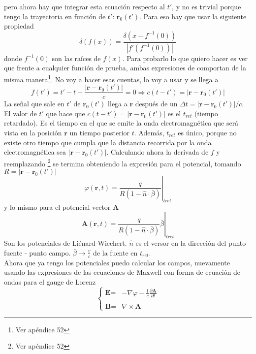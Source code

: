 pero ahora hay que integrar esta ecuación respecto al $t'$, y no es trivial porque tengo la trayectoria en función de $t'$: $\textbf{r}_{0}(t')$. Para eso hay que usar la siguiente propiedad
\begin{equation*}
    \delta(f(x)) = \frac{\delta(x - f^{-1}(0))}{|f'(f^{-1}(0))|}
\end{equation*}
donde $f^{-1}(0)$ son las raíces de $f(x)$. Para probarlo lo que quiero hacer es ver que frente a cualquier función de prueba, ambas expresiones de comportan de la misma manera\footnote{Ver apéndice 52}. No voy a hacer esas cuentas, lo voy a usar y se llega a
\begin{equation*}
    f(t') = t' - t + \frac{|\textbf{r}-\textbf{r}_{0}(t')|}{c} = 0
    \Longrightarrow c(t - t') = |\textbf{r} - \textbf{r}_{0}(t')|
\end{equation*}
La señal que sale en $t'$ de $\textbf{r}_{0}(t')$ llega a $\textbf{r}$ después de un $\Delta t = |\textbf{r}-\textbf{r}_{0}(t')|/c$. El valor de $t'$ que hace que $c(t-t') = |\textbf{r}-\textbf{r}_{0}(t')|$ es el $t_{ret}$ (tiempo retardado). Es el tiempo en el que se emite la onda electromagnética que será vista en la posición $\textbf{r}$ un tiempo posterior $t$. Además, $t_{ret}$ es único, porque no existe otro tiempo que cumpla que la distancia recorrida por la onda electromagnética sea $|\textbf{r}-\textbf{r}_{0}(t')|$. Calculando ahora la derivada de $f$ y reemplazando \footnote{Ver apéndice 52} se termina obteniendo la expresión para el potencial, tomando $R = |\textbf{r}-\textbf{r}_{0}(t')|$
\begin{equation*}
    \varphi(\textbf{r},t) = 
    \left.
        \frac{q}{R(1 - \hat{n}\cdot \bar{\beta})}
    \right|_{tret}
\end{equation*}
y lo mismo para el potencial vector $\textbf{A}$
\begin{equation*}
    \textbf{A}(\textbf{r},t) = 
    \left.
        \frac{q}{R(1 - \hat{n}\cdot \bar{\beta})}
        \bar{\beta}
    \right|_{tret}
\end{equation*}
Son los potenciales de Liénard-Wiechert. $\hat{n}$ es el versor en la dirección del punto fuente - punto campo. $\bar{\beta} \to \frac{v}{c}$ de la fuente en $t_{ret}$.\\
\indent Ahora que ya tengo los potenciales puedo calcular los campos, nuevamente usando las expresiones de las ecuaciones de Maxwell con forma de ecuación de ondas para el gauge de Lorenz
\begin{equation*}
    \left\{
        \begin{array}{ll}
             \textbf{E} = & 
             -\nabla \varphi 
             - \frac{1}{c}\frac{\partial \textbf{A}}{\partial t}  \\
             &\\
             \textbf{B} = & \nabla \times \textbf{A}
        \end{array}
    \right.
\end{equation*}
